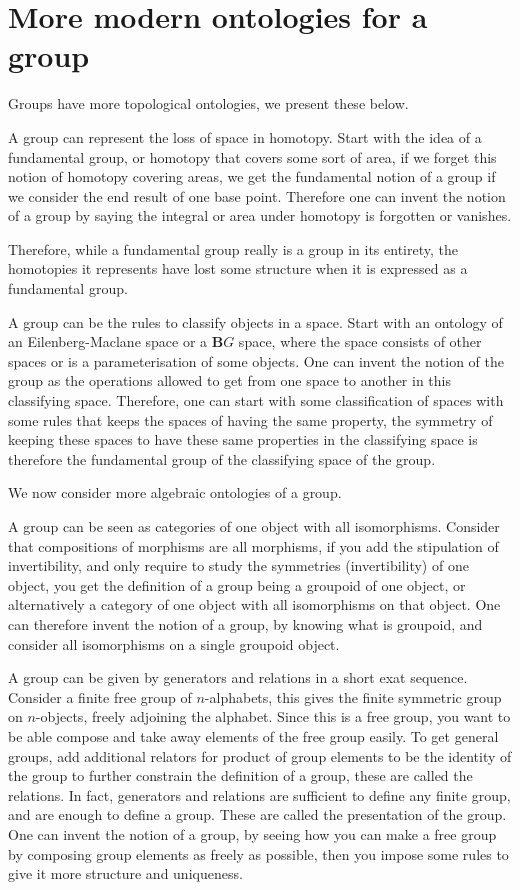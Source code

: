 \documentclass{tufte-book}
\begin{document}
\section{More modern ontologies for a group}

Groups have more topological ontologies, we present these below.

A group can represent the loss of space in homotopy. Start with the idea of a fundamental group, or homotopy that covers some sort of area, if we forget this notion of homotopy covering areas, we get the fundamental notion of a group if we consider the end result of one base point. Therefore one can invent the notion of a group by saying the integral or area under homotopy is forgotten or vanishes.

Therefore, while a fundamental group really is a group in its entirety, the homotopies it represents have lost some structure when it is expressed as a fundamental group.

A group can be the rules to classify objects in a space. Start with an ontology of an Eilenberg-Maclane space or a $\mathbf{B}G$ space, where the space consists of other spaces or is a parameterisation of some objects. One can invent the notion of the group as the operations allowed to get from one space to another in this classifying space. Therefore, one can start with some classification of spaces with some rules that keeps the spaces of having the same property, the symmetry of keeping these spaces to have these same properties in the classifying space is therefore the fundamental group of the classifying space of the group.

We now consider more algebraic ontologies of a group.

A group can be seen as categories of one object with all isomorphisms. Consider that compositions of morphisms are all morphisms, if you add the stipulation of invertibility, and only require to study the symmetries (invertibility) of one object, you get the definition of a group being a groupoid of one object, or alternatively a category of one object with all isomorphisms on that object. One can therefore invent the notion of a group, by knowing what is groupoid, and consider all isomorphisms on a single groupoid object.

A group can be given by generators and relations in a short exat sequence. Consider a finite free group of $n$-alphabets, this gives the finite symmetric group on $n$-objects, freely adjoining the alphabet. Since this is a free group, you want to be able compose and take away elements of the free group easily. To get general groups, add additional relators for product of group elements to be the identity of the group to further constrain the definition of a group, these are called the relations. In fact, generators and relations are sufficient to define any finite group, and are enough to define a group. These are called the presentation of the group. One can invent the notion of a group, by seeing how you can make a free group by composing group elements as freely as possible, then you impose some rules to give it more structure and uniqueness.
\end{document}
